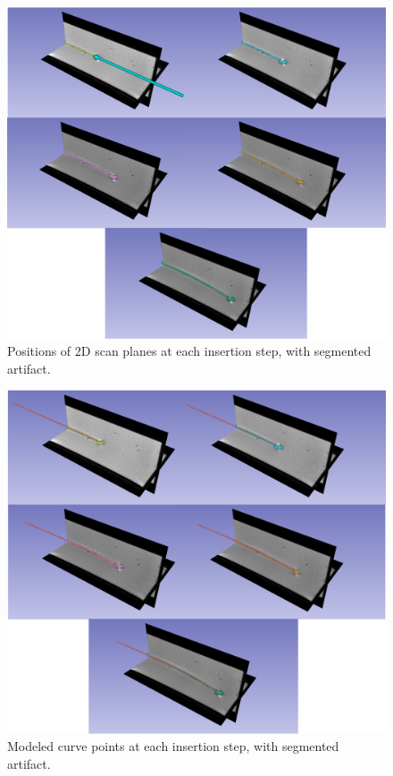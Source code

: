 \begin{figure}[h]
\includegraphics[width=1.0\textwidth]{Fig/chap5/scan_slices.png}
\caption{Positions of 2D scan planes at each insertion step, with segmented artifact.}
\label{fig:scan_slices}
\end{figure}

\begin{figure}[h]
\includegraphics[width=1.0\textwidth]{Fig/chap5/insertions.png}
\caption{Modeled curve points at each insertion step, with segmented artifact.}
\label{fig:curve_points}
\end{figure}

